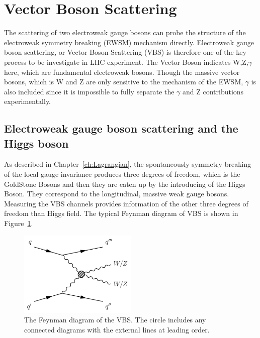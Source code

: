 \section{Vector Boson Scattering}
The scattering of two electroweak gauge bosons can probe the structure of the electroweak symmetry breaking (EWSM) mechanism directly. 
Electroweak gauge boson scattering, or Vector Boson Scattering (VBS) is therefore one of the key process to be investigate in LHC experiment.
The Vector Boson indicates W,Z,$\gamma$ here, which are fundamental electroweak bosons. Though the massive vector bosons, which is W and Z are only sensitive to the mechanism of the  EWSM, $\gamma$ is also included since it is impossible to fully separate the $\gamma$ and Z contributions experimentally. 
\subsection{Electroweak gauge boson scattering and the Higgs boson}
As described in Chapter~\ref{ch:Lagrangian}, the spontaneously symmetry breaking of the local gauge invariance produces three degrees of freedom, which is the GoldStone Bosons and then they are eaten up by the introducing of the Higgs Boson. They correspond to the longitudinal, massive weak gauge bosons. Measuring the VBS channels provides information of the other three degrees of freedom than Higgs field. The typical Feynman diagram of VBS is shown in Figure~\ref{fig:VBS}.

\begin{figure}[tbp]
\begin{center}
 \includegraphics[width=0.50\textwidth,keepaspectratio]{figures/VBS}
\caption{
The Feynman diagram of the VBS. The circle includes any connected diagrams with the external lines at leading order.%
}
\label{fig:VBS}
\end{center}
\end{figure}

